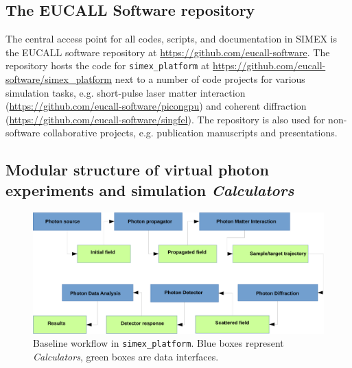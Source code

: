 \documentclass[12pt]{scrartcl}
\begin{document}
\subsection{The EUCALL Software repository}
The central access point for all codes, scripts, and documentation in SIMEX is
the EUCALL software repository at
\url{https://github.com/eucall-software}. The repository hosts
the code for \texttt{simex\_platform} at
\url{https://github.com/eucall-software/simex\_platform} next to a number of code
projects for various simulation tasks, e.g. short-pulse laser matter interaction
(\url{https://github.com/eucall-software/picongpu}) and coherent diffraction
(\url{https://github.com/eucall-software/singfel}). The repository is
also used for non-software collaborative projects, e.g. publication manuscripts
and presentations.
%
\subsection{Modular structure of virtual photon experiments and simulation
  \textit{Calculators}}
\begin{figure}[ht]
  \begin{center}
    \includegraphics[width=1.0\textwidth,angle=0,clip]{simex_baseline_workflow-crop}
  \end{center}
\caption{Baseline workflow in \texttt{simex\_platform}. Blue boxes represent
\textit{Calculators}, green boxes are data interfaces.}
  \label{fig:simex_baseline_workflow}
\end{figure}
\end{document}
